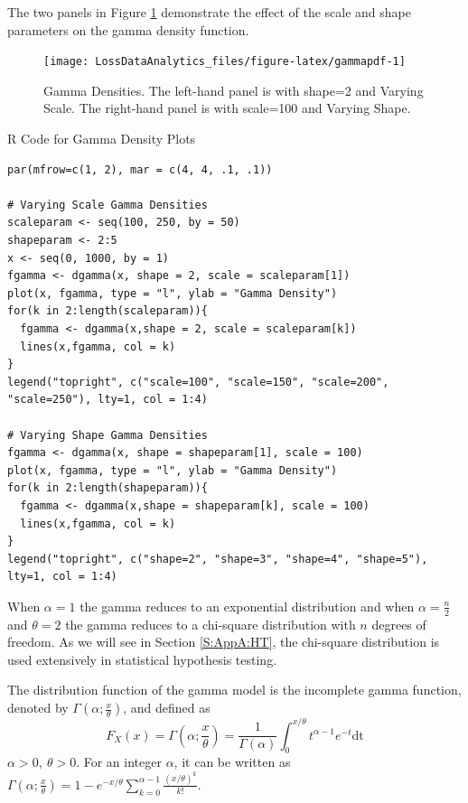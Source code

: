 \documentclass[]{book}
\theoremstyle{definition}
\theoremstyle{definition}
\theoremstyle{definition}
\theoremstyle{remark}
\begin{document}
The two panels in Figure \ref{fig:gammapdf} demonstrate the effect of
the scale and shape parameters on the gamma density function.

\begin{figure}

{\centering \texttt{[image: LossDataAnalytics\_files/figure-latex/gammapdf-1]} 

}

\caption{Gamma Densities. The left-hand panel is with shape=2 and Varying Scale. 
 The right-hand panel is with scale=100 and Varying Shape.}\label{fig:gammapdf}
\end{figure}

R Code for Gamma Density Plots

\hypertarget{display.gammascale.2}{}
\begin{verbatim}
par(mfrow=c(1, 2), mar = c(4, 4, .1, .1))

# Varying Scale Gamma Densities
scaleparam <- seq(100, 250, by = 50)
shapeparam <- 2:5
x <- seq(0, 1000, by = 1)
fgamma <- dgamma(x, shape = 2, scale = scaleparam[1])
plot(x, fgamma, type = "l", ylab = "Gamma Density")
for(k in 2:length(scaleparam)){
  fgamma <- dgamma(x,shape = 2, scale = scaleparam[k])
  lines(x,fgamma, col = k)
}
legend("topright", c("scale=100", "scale=150", "scale=200", "scale=250"), lty=1, col = 1:4)

# Varying Shape Gamma Densities
fgamma <- dgamma(x, shape = shapeparam[1], scale = 100)
plot(x, fgamma, type = "l", ylab = "Gamma Density")
for(k in 2:length(shapeparam)){
  fgamma <- dgamma(x,shape = shapeparam[k], scale = 100)
  lines(x,fgamma, col = k)
}
legend("topright", c("shape=2", "shape=3", "shape=4", "shape=5"), lty=1, col = 1:4)
\end{verbatim}

When \(\alpha = 1\) the gamma reduces to an exponential distribution and
when \(\alpha = \frac{n}{2}\) and \(\theta = 2\) the gamma reduces to a
chi-square distribution with \(n\) degrees of freedom. As we will see in
Section \ref{S:AppA:HT}, the chi-square distribution is used extensively
in statistical hypothesis testing.

The distribution function of the gamma model is the incomplete gamma
function, denoted by \(\Gamma\left(\alpha; \frac{x}{\theta} \right)\),
and defined as
\[F_{X}\left( x \right) = \Gamma\left( \alpha; \frac{x}{\theta} \right) = \frac{1}{\Gamma\left( \alpha \right)}\int_{0}^{x /\theta}t^{\alpha - 1}e^{- t}\text{dt}\]
\(\alpha > 0,\ \theta > 0\). For an integer \(\alpha\), it can be
written as
\(\Gamma\left( \alpha; \frac{x}{\theta} \right) = 1 - e^{-x/\theta}\sum_{k = 0}^{\alpha-1}\frac{(x/\theta)^k}{k!}\).
\end{document}
